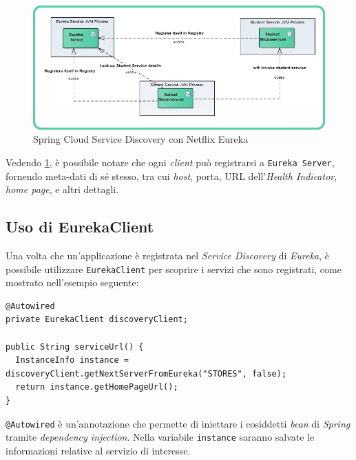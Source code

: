 \begin{figure}[H]
	\centering
	\includegraphics[width=\textwidth]{immagini/netflix-eureka.png}
	\caption[Spring Cloud Service Discovery con Netflix Eureka]{Spring Cloud Service Discovery con Netflix Eureka\footnotemark}
	\label{netflix-eureka}
\end{figure}

Vedendo \ref{netflix-eureka}, è possibile notare che ogni \textit{client} può registrarsi a \texttt{Eureka Server}, fornendo meta-dati di sé stesso, tra cui \textit{host}, porta, URL dell'\textit{Health Indicator}, \textit{home page}, e altri dettagli.

\subsection{Uso di EurekaClient} Una volta che un'applicazione è registrata nel \textit{Service Discovery} di \textit{Eureka}, è possibile utilizzare \texttt{EurekaClient} per scoprire i servizi che sono registrati, come mostrato nell'esempio seguente:

 \begin{tcolorbox}
 	\begin{lstlisting}
@Autowired
private EurekaClient discoveryClient;

public String serviceUrl() {
  InstanceInfo instance = discoveryClient.getNextServerFromEureka("STORES", false);
  return instance.getHomePageUrl();
}
 	\end{lstlisting}
 \end{tcolorbox}

\texttt{@Autowired} è un'annotazione che permette di iniettare i cosiddetti \textit{bean} di \textit{Spring} tramite \textit{dependency injection}. Nella variabile \texttt{instance} saranno salvate le informazioni relative al servizio di interesse.

